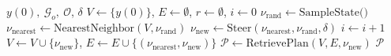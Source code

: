\begin{algorithm}[ht]
\caption{Traditional RRT Algorithm}
\label{alg:traditional_rrt}
\begin{algorithmic}[1]
\Require $y(0), ~\mathcal{G}_o,~\mathcal{O}$, $\delta$
\State $V \gets \{y(0)\}$, $E \gets \emptyset$, $r \gets \emptyset$, $i \gets 0$
    \State $\nu_{\text{rand}} \gets \text{SampleState()}$
    \State $\nu_{\text{nearest}} \gets \text{NearestNeighbor}(V, \nu_{\text{rand}})$
    \State $\nu_{\text{new}} \gets \text{Steer}(\nu_{\text{nearest}}, \nu_{\text{rand}}, \delta)$
    \State $i \gets i + 1$
        \State $V \gets V \cup \{\nu_{\text{new}}\}$, $E \gets E \cup \{(\nu_{\text{nearest}}, \nu_{\text{new}})\}$
    \EndIf
        \State $\mathcal{P} \gets \text{RetrievePlan}(V, E, \nu_{\text{new}})$
        \State \Return $\mathcal{P}$
    \EndIf
\EndWhile
\end{algorithmic}
\end{algorithm}

